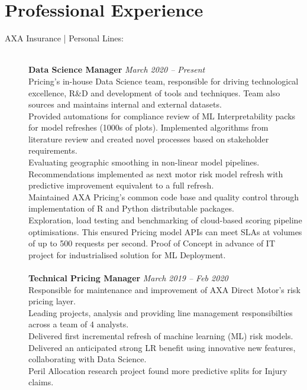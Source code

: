 \documentclass[11pt]{article}
\begin{document}
\section*{Professional Experience}
\begin{description}

\item[AXA Insurance | Personal Lines:] \hspace{1mm} \\
\textbf{Data Science Manager} \emph{March 2020 -- Present}\\
\textbullet \quad Pricing's in-house Data Science team, responsible for driving technological excellence, R\&D and development of tools and techniques. Team also sources and maintains internal and external datasets. \\
\textbullet \quad Provided automations for compliance review of ML Interpretability packs for model refreshes (1000s of plots). Implemented algorithms from literature review and created novel processes based on stakeholder requirements. \\
\textbullet \quad Evaluating geographic smoothing in non-linear model pipelines. Recommendations implemented as next motor risk model refresh with predictive improvement equivalent to a full refresh.\\
\textbullet \quad Maintained AXA Pricing's common code base and quality control through implementation of R and Python distributable packages. \\
\textbullet \quad Exploration, load testing and benchmarking of cloud-based scoring pipeline optimisations. This ensured Pricing model APIs can meet SLAs at volumes of up to 500 requests per second. Proof of Concept in advance of IT project for industrialised solution for ML Deployment.
\\\\
\textbf{Technical Pricing Manager} \emph{March 2019 -- Feb 2020}\\
\textbullet \quad Responsible for maintenance and improvement of AXA Direct Motor's risk pricing layer.\\
\textbullet \quad Leading projects, analysis and providing line management responsibilties across a team of 4 analysts.\\
\textbullet \quad Delivered first incremental refresh of machine learning (ML) risk models. Delivered an anticipated strong LR benefit using innovative new features, collaborating with Data Science.\\
\textbullet \quad Peril Allocation research project found more predictive splits for Injury claims.\\

\end{description}
\end{document}
